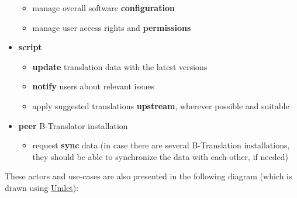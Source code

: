 \documentclass[11pt]{article}
\begin{document}
\begin{itemize}
\begin{itemize}
\item manage overall software \textbf{configuration}
\item manage user access rights and \textbf{permissions}
\end{itemize}

\item \textbf{script}

\begin{itemize}
\item \textbf{update} translation data with the latest versions
\item \textbf{notify} users about relevant issues
\item apply suggested translations \textbf{upstream}, wherever possible and
       suitable
\end{itemize}

\item \textbf{peer} B-Translator installation

\begin{itemize}
\item request \textbf{sync} data (in case there are several B-Translation
       installations, they should be able to synchronize the data with
       each-other, if needed)
\end{itemize}

\end{itemize}
   These actors and use-cases are also presented in the following
   diagram (which is drawn using \href{http://www.umlet.com/}{Umlet}):
\end{document}
